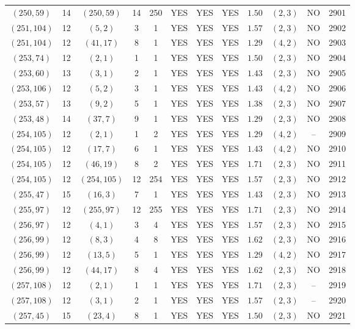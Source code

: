 \begin{longtable}{|c|c|c|c|c|c|c|c|c|c|c|c|}
$(250,59)$ & 14 & $(250,59)$ & 14 & 250 & YES & YES & YES & $1.50$ & $(2,3)$ & NO & 2901\\
$(251,104)$ & 12 & $(5,2)$ & 3 & 1 & YES & YES & YES & $1.57$ & $(2,3)$ & NO & 2902\\
$(251,104)$ & 12 & $(41,17)$ & 8 & 1 & YES & YES & YES & $1.29$ & $(4,2)$ & NO & 2903\\
$(253,74)$ & 12 & $(2,1)$ & 1 & 1 & YES & YES & YES & $1.50$ & $(2,3)$ & NO & 2904\\
$(253,60)$ & 13 & $(3,1)$ & 2 & 1 & YES & YES & YES & $1.43$ & $(2,3)$ & NO & 2905\\
$(253,106)$ & 12 & $(5,2)$ & 3 & 1 & YES & YES & YES & $1.43$ & $(4,2)$ & NO & 2906\\
$(253,57)$ & 13 & $(9,2)$ & 5 & 1 & YES & YES & YES & $1.38$ & $(2,3)$ & NO & 2907\\
$(253,48)$ & 14 & $(37,7)$ & 9 & 1 & YES & YES & YES & $1.29$ & $(2,3)$ & NO & 2908\\
$(254,105)$ & 12 & $(2,1)$ & 1 & 2 & YES & YES & YES & $1.29$ & $(4,2)$ & -- & 2909\\
$(254,105)$ & 12 & $(17,7)$ & 6 & 1 & YES & YES & YES & $1.43$ & $(4,2)$ & NO & 2910\\
$(254,105)$ & 12 & $(46,19)$ & 8 & 2 & YES & YES & YES & $1.71$ & $(2,3)$ & NO & 2911\\
$(254,105)$ & 12 & $(254,105)$ & 12 & 254 & YES & YES & YES & $1.57$ & $(2,3)$ & NO & 2912\\
$(255,47)$ & 15 & $(16,3)$ & 7 & 1 & YES & YES & YES & $1.43$ & $(2,3)$ & NO & 2913\\
$(255,97)$ & 12 & $(255,97)$ & 12 & 255 & YES & YES & YES & $1.71$ & $(2,3)$ & NO & 2914\\
$(256,97)$ & 12 & $(4,1)$ & 3 & 4 & YES & YES & YES & $1.57$ & $(2,3)$ & NO & 2915\\
$(256,99)$ & 12 & $(8,3)$ & 4 & 8 & YES & YES & YES & $1.62$ & $(2,3)$ & NO & 2916\\
$(256,99)$ & 12 & $(13,5)$ & 5 & 1 & YES & YES & YES & $1.29$ & $(4,2)$ & NO & 2917\\
$(256,99)$ & 12 & $(44,17)$ & 8 & 4 & YES & YES & YES & $1.62$ & $(2,3)$ & NO & 2918\\
$(257,108)$ & 12 & $(2,1)$ & 1 & 1 & YES & YES & YES & $1.71$ & $(2,3)$ & -- & 2919\\
$(257,108)$ & 12 & $(3,1)$ & 2 & 1 & YES & YES & YES & $1.57$ & $(2,3)$ & -- & 2920\\
$(257,45)$ & 15 & $(23,4)$ & 8 & 1 & YES & YES & YES & $1.50$ & $(2,3)$ & NO & 2921\\

\end{longtable}
